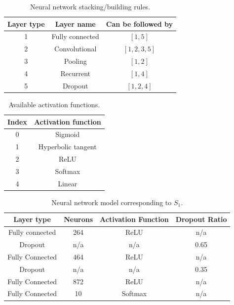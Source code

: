 \documentclass[journal]{IEEEtran}
\begin{document}
\begin{table}[!htb]
\begin{center}
\begin{tabular}{| c | c | c |}
\hline
Layer type & Layer name & Can be followed by \\
\hline
1 & Fully connected & $\left[ 1, 5 \right]$ \\
2 & Convolutional & $\left[ 1, 2, 3, 5 \right]$ \\
3 & Pooling & $\left[ 1, 2 \right]$\\
4 & Recurrent & $\left[ 1, 4 \right]$\\
5 & Dropout & $\left[ 1, 2, 4 \right]$\\
\hline
\end{tabular}
\end{center}
\caption{Neural network stacking/building rules.}
\label{table:neural_network_building_rules}
\end{table}

\begin{table}[!htb]
\begin{center}
\begin{tabular}{| c | c |}
\hline
Index & Activation function \\
\hline
0 & Sigmoid \\
1 & Hyperbolic tangent \\
2 & ReLU \\
3 & Softmax \\
4 & Linear \\
\hline
\end{tabular}
\end{center}
\caption{Available activation functions.}
\label{table:index_to_activation_functions}
\end{table}

\begin{table}[!htb]
\begin{center}
\begin{tabular}{| c | c | c | c |}
\hline
Layer type & Neurons & Activation Function & Dropout Ratio \\
\hline
Fully connected & 264 & ReLU & n/a \\
Dropout & n/a & n/a & 0.65 \\
Fully Connected & 464 & ReLU & n/a\\
Dropout & n/a & n/a & 0.35\\
Fully Connected & 872 & ReLU & n/a\\
Fully Connected & 10 & Softmax & n/a\\
\hline
\end{tabular}
\end{center}
\caption{Neural network model corresponding to $S_1$.}
\label{table:neural_network_model_S1}
\end{table}
\end{document}
